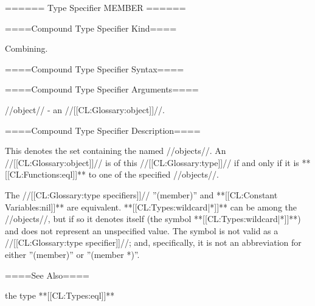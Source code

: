 ====== Type Specifier MEMBER ======

====Compound Type Specifier Kind====

Combining.

====Compound Type Specifier Syntax====


====Compound Type Specifier Arguments====

//object// - an //[[CL:Glossary:object]]//.

====Compound Type Specifier Description====

This denotes the set containing the named //objects//. An //[[CL:Glossary:object]]// is of this //[[CL:Glossary:type]]// if and only if it is **[[CL:Functions:eql]]** to one of the specified //objects//.

The //[[CL:Glossary:type specifiers]]// ''(member)'' and **[[CL:Constant Variables:nil]]** are equivalent. **[[CL:Types:wildcard|*]]** can be among the //objects//, but if so it denotes itself (the symbol **[[CL:Types:wildcard|*]]**) and does not represent an unspecified value. The symbol  is not valid as a //[[CL:Glossary:type specifier]]//; and, specifically, it is not an abbreviation for either ''(member)'' or ''(member *)''.

====See Also====

the type **[[CL:Types:eql]]**

